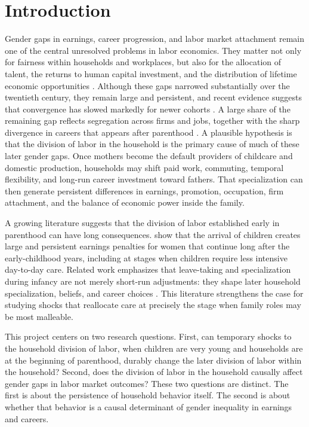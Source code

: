 \documentclass[12pt]{article}
\begin{document}
\newpage

\section{Introduction}

Gender gaps in earnings, career progression, and labor market attachment remain one of the central unresolved problems in labor economics. They matter not only for fairness within households and workplaces, but also for the allocation of talent, the returns to human capital investment, and the distribution of lifetime economic opportunities \citep{hsieh2019allocation}. Although these gaps narrowed substantially over the twentieth century, they remain large and persistent, and recent evidence suggests that convergence has slowed markedly for newer cohorts \citep{goldin2014grand,arellano2024one}. A large share of the remaining gap reflects segregation across firms and jobs, together with the sharp divergence in careers that appears after parenthood \citep{blau2016gender,card2016bargaining,kleven2019children}. A plausible hypothesis is that the division of labor in the household is the primary cause of much of these later gender gaps. Once mothers become the default providers of childcare and domestic production, households may shift paid work, commuting, temporal flexibility, and long-run career investment toward fathers. That specialization can then generate persistent differences in earnings, promotion, occupation, firm attachment, and the balance of economic power inside the family.

A growing literature suggests that the division of labor established early in parenthood can have long consequences. \citet{kleven2019childpenalties} show that the arrival of children creates large and persistent earnings penalties for women that continue long after the early-childhood years, including at stages when children require less intensive day-to-day care. Related work emphasizes that leave-taking and specialization during infancy are not merely short-run adjustments: they shape later household specialization, beliefs, and career choices \citep{moberg2023gendered,canaan2022parental,kleven2026paternity}. This literature strengthens the case for studying shocks that reallocate care at precisely the stage when family roles may be most malleable.

This project centers on two research questions. First, can temporary shocks to the household division of labor, when children are very young and households are at the beginning of parenthood, durably change the later division of labor within the household? Second, does the division of labor in the household causally affect gender gaps in labor market outcomes? These two questions are distinct. The first is about the persistence of household behavior itself. The second is about whether that behavior is a causal determinant of gender inequality in earnings and careers.
\end{document}
